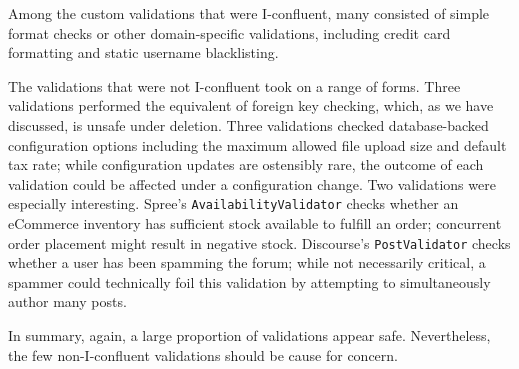 Among the custom validations that were I-confluent, many consisted of
simple format checks or other domain-specific validations, including
credit card formatting and static username blacklisting.

The validations that were not I-confluent took on a range of
forms. Three validations performed the equivalent of foreign key
checking, which, as we have discussed, is unsafe under deletion. Three
validations checked database-backed configuration options including
the maximum allowed file upload size and default tax rate; while
configuration updates are ostensibly rare, the outcome of each
validation could be affected under a configuration change. Two
validations were especially interesting. Spree's
\texttt{AvailabilityValidator} checks whether an eCommerce inventory
has sufficient stock available to fulfill an order; concurrent order
placement might result in negative stock. Discourse's
\texttt{PostValidator} checks whether a user has been spamming the
forum; while not necessarily critical, a spammer could technically
foil this validation by attempting to simultaneously author many posts.

In summary, again, a large proportion of validations appear
safe. Nevertheless, the few non-I-confluent validations should be
cause for concern.


